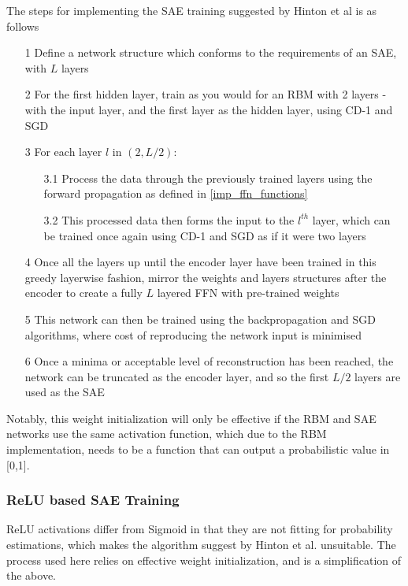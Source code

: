 \documentclass[a4paper,11pt,oneside]{article}
\theoremstyle{plain}
\theoremstyle{definition}
\begin{document}
	The steps for implementing the SAE training suggested by Hinton et al \cite{Hinton2} is as follows
	
	\begin{itemize}
		\item [1] Define a network structure which conforms to the requirements of an SAE, with $L$ layers
		\item [2] For the first hidden layer, train as you would for an RBM with 2 layers - with the input layer, and the first layer as the hidden layer, using CD-1 and SGD
		\item [3] For each layer $l$ in $(2, L/2)$:
		\begin{itemize}
			\item [3.1] Process the data through the previously trained layers using the forward propagation as defined in \ref{imp_ffn_functions}
			\item [3.2] This processed data then forms the input to the $l^{th}$ layer, which can be trained once again using CD-1 and SGD as if it were two layers
		\end{itemize}
		\item[4] Once all the layers up until the encoder layer have been trained in this greedy layerwise fashion, mirror the weights and layers structures after the encoder to create a fully $L$ layered FFN with pre-trained weights
		\item [5] This network can then be trained using the backpropagation and SGD algorithms, where cost of reproducing the network input is minimised
		\item [6] Once a minima or acceptable level of reconstruction has been reached, the network can be truncated as the encoder layer, and so the first $L/2$ layers are used as the SAE
	\end{itemize}
	
	Notably, this weight initialization will only be effective if the RBM and SAE networks use the same activation function, which due to the RBM implementation, needs to be a function that can output a probabilistic value in [0,1].
	
	\subsubsection{ReLU based SAE Training}\label{imp_relusae}
	
	ReLU activations differ from Sigmoid in that they are not fitting for probability estimations, which makes the algorithm suggest by Hinton et al. unsuitable. The process used here relies on effective weight initialization, and is a simplification of the above.
	
\end{document}
